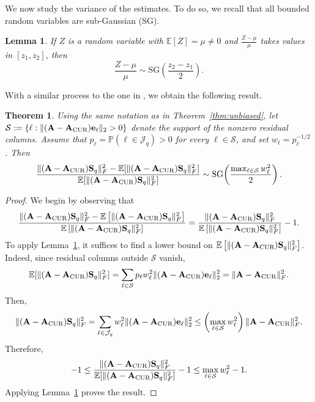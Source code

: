 \documentclass[11pt]{article}
\newcommand{\curX}{\mathbf{A}_{\textup{CUR}}}
\newtheorem{theorem}{Theorem}
\newtheorem{lemma}{Lemma}
\begin{document}
We now study the variance of the estimates. To do so, we recall that all bounded random variables are sub-Gaussian (SG).
\begin{lemma}
    \label{lemma:boundedvar}
    \cite{Wainwright} If $Z$ is a random variable with $\mathbb{E}[Z] = \mu \neq 0$ and $\frac{Z - \mu}{\mu}$ takes values in $[z_1, z_2]$, then
    \begin{equation*}
        \frac{Z - \mu}{\mu} \sim \mathrm{SG}\!\left(\frac{z_2 - z_1}{2}\right).
    \end{equation*}
\end{lemma}
With a similar process to the one in \cite{pritchard2024solving}, we obtain the following result.
\begin{theorem}\label{thm:SG}
    Using the same notation as in Theorem~\ref{thm:unbiased}, let
    $\mathcal{S}:=\{\ell:\|(\mathbf{A}-\curX)\mathbf{e}_{\ell}\|_2>0\}$ denote the support of the nonzero residual columns.
    Assume that $p_{\ell}=\mathbb{P}(\ell\in\mathcal{J}_q)>0$ for every $\ell\in\mathcal{S}$, and set $w_{\ell}=p_{\ell}^{-1/2}$.
    Then
    \begin{equation}
        \frac{\| (\mathbf{A}-\curX)\mathbf{S}_q\|_F^2-\mathbb{E}[\|(\mathbf{A}-\curX)\mathbf{S}_q\|_F^2]}{\mathbb{E}[\|(\mathbf{A}-\curX)\mathbf{S}_q\|_F^2]}
        \sim \mathrm{SG}\!\left(\frac{\max_{\ell\in\mathcal{S}}w_{\ell}^2}{2}\right).
    \end{equation}
\end{theorem}
\begin{proof}
    We begin by observing that
    \begin{equation*}
        \frac{\|(\mathbf{A}-\curX) \mathbf{S}_q\|_F^2 - \mathbb{E}\left[\|(\mathbf{A}-\curX) \mathbf{S}_q\|_F^2\right]}{\mathbb{E}\left[\|(\mathbf{A}-\curX)\mathbf{S}_q\|_F^2\right]}
        = \frac{\|(\mathbf{A}-\curX)\mathbf{S}_q\|_F^2}{\mathbb{E}\left[\|(\mathbf{A}-\curX)\mathbf{S}_q\|_F^2\right]} - 1.
    \end{equation*}
    To apply Lemma~\ref{lemma:boundedvar}, it suffices to find a lower bound on $\mathbb{E}\left[\|(\mathbf{A}-\curX)\mathbf{S}_q\|_F^2\right]$.
    Indeed, since residual columns outside $\mathcal{S}$ vanish,
    \begin{equation*}
        \mathbb{E}[\|(\mathbf{A}-\curX)\mathbf{S}_q\|_F^2]
        =\sum_{\ell\in\mathcal{S}}p_{\ell}w_{\ell}^2\|(\mathbf{A}-\curX)\mathbf{e}_{\ell}\|_2^2
        =\|\mathbf{A}-\curX\|_F^2.
    \end{equation*}
    Then,
    \begin{equation*}
        \|(\mathbf{A}-\curX)\mathbf{S}_q\|_F^2
        =\sum_{\ell\in\mathcal{J}_q}w_{\ell}^2\|(\mathbf{A}-\curX)\mathbf{e}_{\ell}\|_2^2
        \leq \left(\max_{\ell\in\mathcal{S}}w_{\ell}^2\right)\|\mathbf{A}-\curX\|_F^2.
    \end{equation*}
    Therefore,
    \begin{equation*}
        -1\leq \frac{\|(\mathbf{A}-\curX)\mathbf{S}_q\|_F^2}{\mathbb{E}[\|(\mathbf{A}-\curX)\mathbf{S}_q\|_F^2]}-1
        \leq \max_{\ell\in\mathcal{S}}w_{\ell}^2-1.
    \end{equation*}
    Applying Lemma~\ref{lemma:boundedvar} proves the result.
\end{proof}
\end{document}
